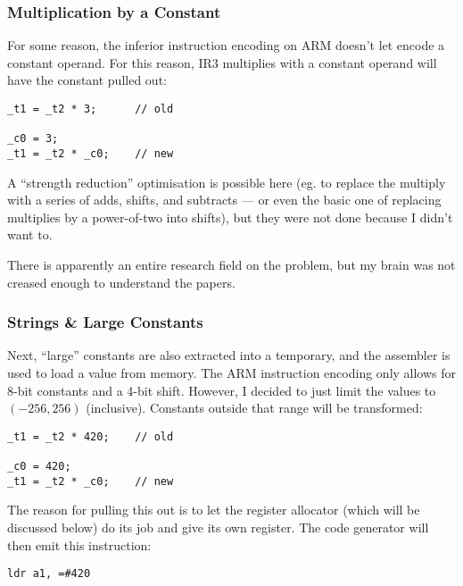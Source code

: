 \documentclass[12pt]{article}
\begin{document}
\subsubsection{Multiplication by a Constant}

For some reason, the inferior instruction encoding on ARM doesn't let  encode a constant operand. For this
reason, IR3 multiplies with a constant operand will have the constant pulled out:

\begin{verbatim}
_t1 = _t2 * 3;      // old

_c0 = 3;
_t1 = _t2 * _c0;    // new
\end{verbatim}

A \enquote{strength reduction} optimisation is possible here (eg. to replace the multiply with a series of adds, shifts,
and subtracts --- or even the basic one of replacing multiplies by a power-of-two into shifts), but they were not done
because I didn't want to.

There is apparently an entire research field on the  problem, but my brain was not
creased enough to understand the papers.




\subsubsection{Strings \& Large Constants}

Next, \enquote{large} constants are also extracted into a temporary, and the assembler is used to load a value from
memory. The ARM instruction encoding only allows for 8-bit constants and a 4-bit shift. However, I decided
to just limit the values to $(-256, 256)$ (inclusive). Constants outside that range will be transformed:

\begin{verbatim}
_t1 = _t2 * 420;    // old

_c0 = 420;
_t1 = _t2 * _c0;    // new
\end{verbatim}

The reason for pulling this out is to let the register allocator (which will be discussed below) do its job and give
 its own register. The code generator will then emit this instruction:

\begin{verbatim}
ldr a1, =#420
\end{verbatim}
\end{document}
